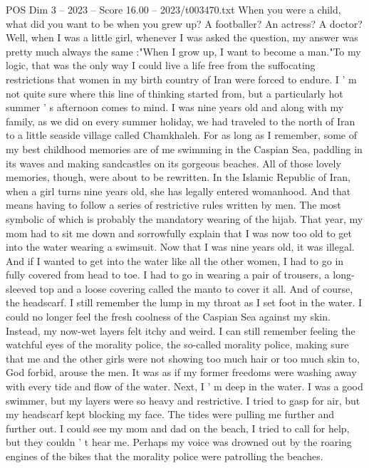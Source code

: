 \begin{textsample}{POS Dim 3 – 2023 – Score 16.00 – 2023/t003470.txt}  \label{ex:f3_pos_038}
When you were a child, what did you want to be when you grew up?
A footballer?
An actress?
A doctor?
Well, when I was a little girl, whenever I was asked the question, my answer was pretty much always the same :"When I grow up, I want to become a man."To my logic, that was the only way I could live a life free from the suffocating restrictions that women in my birth country of Iran were forced to endure.
I ' m not quite sure where this line of thinking started from, but a particularly hot summer ' s afternoon comes to mind.
I was nine years old and along with my family, as we did on every summer holiday, we had traveled to the north of Iran to a little seaside village called Chamkhaleh.
For as long as I remember, some of my best childhood memories are of me swimming in the Caspian Sea, paddling in its waves and making sandcastles on its gorgeous beaches.
All of those lovely memories, though, were about to be rewritten.
In the Islamic Republic of Iran, when a girl turns nine years old, she has legally entered womanhood.
And that means having to follow a series of restrictive rules written by men.
The most symbolic of which is probably the mandatory wearing of the hijab.
That year, my mom had to sit me down and sorrowfully explain that I was now too old to get into the water wearing a swimsuit.
Now that I was nine years old, it was illegal.
And if I wanted to get into the water like all the other women, I had to go in fully covered from head to toe.
I had to go in wearing a pair of trousers, a long-sleeved top and a loose covering called the manto to cover it all.
And of course, the headscarf.
I still remember the lump in my throat as I set foot in the water.
I could no longer feel the fresh coolness of the Caspian Sea against my skin.
Instead, my now-wet layers felt itchy and weird.
I can still remember feeling the watchful eyes of the morality police, the so-called morality police, making sure that me and the other girls were not showing too much hair or too much skin to, God forbid, arouse the men.
It was as if my former freedoms were washing away with every tide and flow of the water.
Next, I ' m deep in the water.
I was a good swimmer, but my layers were so heavy and restrictive.
I tried to gasp for air, but my headscarf kept blocking my face.
The tides were pulling me further and further out.
I could see my mom and dad on the beach, I tried to call for help, but they couldn ' t hear me.
Perhaps my voice was drowned out by the roaring engines of the bikes that the morality police were patrolling the beaches.

\end{textsample}
